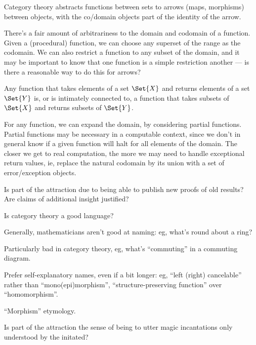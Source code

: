\documentclass[11pt,openany]{article}
\begin{document}
Category theory abstracts functions between sets to
arrows (maps, morphisms) between objects,
with the co/domain objects part of the identity of the arrow.

There's a fair amount of arbitrariness 
to the domain and codomain of a function.
Given a (procedural) function,
we can choose any superset of the range as the codomain.
We can also restrict a function to any subset of the domain,
and it may be important to know that one function is a simple 
restriction another --- is there a reasonable way to do this
for arrows?

Any function that takes elements of a set $\Set{X}$
and returns elements of a set $\Set{Y}$
is, or is intimately connected to, 
a function that takes subsets of $\Set{X}$ and returns
subsets of $\Set{Y}$.


For any function, we can expand the domain, by considering partial
functions. 
Partial functions may be necessary in a computable context,
since we don't in general know if a given function will
halt for all elements of the domain.
The closer we get to real computation, the more we may need to
handle exceptional return values, ie, replace the natural
codomain by its union with a set of error/exception objects.

Is part of the attraction due to being able to publish
new proofs of old results?
Are claims of additional insight justified?

\label{sec:Naming}

Is category theory a good language?

Generally, mathematicians aren't good at naming:
eg, what's round about a ring?

Particularly bad in category theory, eg, 
what's ``commuting'' in a commuting diagram.

Prefer self-explanatory names, even if a bit longer:
eg, ``left (right) cancelable'' rather than ``mono(epi)morphism'',
``structure-preserving function'' over ``homomorphism''.

``Morphism'' etymology.

Is part of the attraction the sense of being to utter magic 
incantations only understood by the initated?

 
\setcounter{currentlevel}{\value{baseSectionLevel}}
\label{sec:Graphical-language}

\setcounter{currentlevel}{\value{baseSectionLevel}}
\label{sec:Key-ideas}
\end{document}
